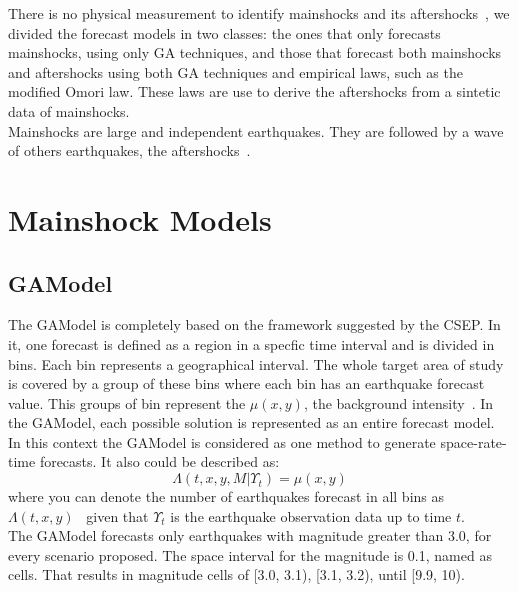There is no physical measurement to identify mainshocks and its aftershocks~\cite{schorlemmer2010first}, we divided the forecast models in two classes: the ones that only forecasts mainshocks, using only GA techniques, and those that forecast both mainshocks and aftershocks using both GA techniques and empirical laws, such as the modified Omori law. These laws are use to derive the aftershocks from a sintetic data of mainshocks.\\

Mainshocks are large and independent earthquakes. They are followed by a wave of others earthquakes, the aftershocks~\cite{schorlemmer2010first}.\\

\section{Mainshock Models}
\subsection{GAModel}\label{GAModel}
The GAModel is completely based on the framework suggested by the CSEP. In it, one forecast is defined as a region in a specfic time interval and is divided in bins. Each bin represents a geographical interval. The whole target area of study is covered by a group of these bins where each bin has an earthquake forecast value. This groups of bin represent the $\mu(x,y)$, the background intensity~\cite{zhuang2004analyzing}. In the GAModel, each possible solution is represented as an entire forecast model.\\

In this context the GAModel is considered as one method to generate
space-rate-time forecasts. It also could be described as:
\begin{equation}\label{gamodel}
 \Lambda(t,x,y,M|\Upsilon_t) = \mu(x,y)
\end{equation}
where you can denote the number of earthquakes forecast in all bins 
as $\Lambda(t,x,y)$~\cite{zechar2010evaluating} given that $\Upsilon_t$ 
is the earthquake observation data up to time $t$.\\

The GAModel forecasts only earthquakes with magnitude greater than 3.0, for every scenario proposed. The space interval for the magnitude is 0.1, named as cells. That results in magnitude cells of [3.0, 3.1), [3.1, 3.2), until [9.9, 10).\\

